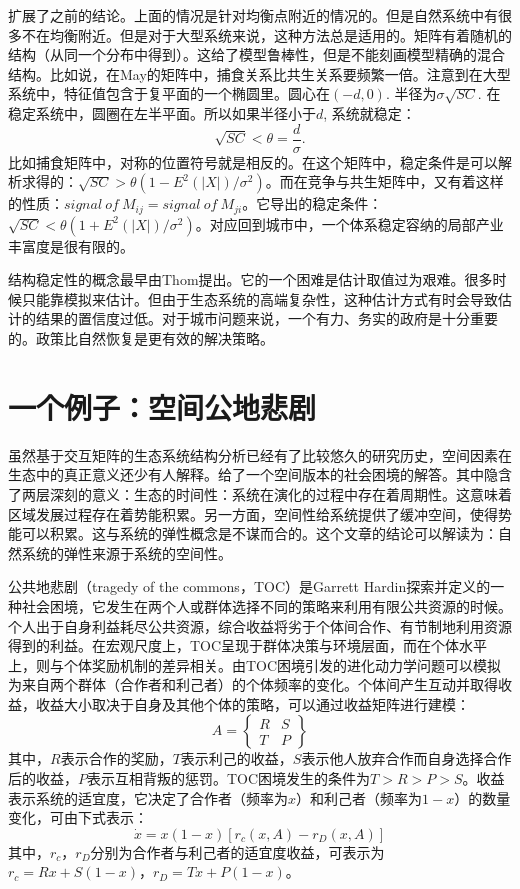 \cite{Allesina2012}扩展了之前的结论。上面的情况是针对均衡点附近的情况的。但是自然系统中有很多不在均衡附近。但是对于大型系统来说，这种方法总是适用的。矩阵有着随机的结构（从同一个分布中得到）。这给了模型鲁棒性，但是不能刻画模型精确的混合结构。比如说，在May的矩阵中，捕食关系比共生关系要频繁一倍。注意到在大型系统中，特征值包含于复平面的一个椭圆里。圆心在$(-d,0).$ 半径为$\sigma\sqrt{SC}.$ 在稳定系统中，圆圈在左半平面。所以如果半径小于$d$, 系统就稳定：\[\sqrt{SC}<\theta =\frac{d}{\sigma}.\]比如捕食矩阵中，对称的位置符号就是相反的。在这个矩阵中，稳定条件是可以解析求得的：$\sqrt{SC}>\theta(1-E^2(|X|)/\sigma^2)$。而在竞争与共生矩阵中，又有着这样的性质：$signal\ of\ M_{ij}=signal\ of\ M_{ji}$。它导出的稳定条件：$\sqrt{SC}<\theta(1+E^2(|X|)/\sigma^2)$。对应回到城市中，一个体系稳定容纳的局部产业丰富度是很有限的。

结构稳定性的概念最早由Thom\cite{thom2018structural}提出。它的一个困难是估计取值过为艰难。很多时候只能靠模拟来估计。但由于生态系统的高端复杂性，这种估计方式有时会导致估计的结果的置信度过低。对于城市问题来说，一个有力、务实的政府是十分重要的。政策比自然恢复是更有效的解决策略。


\section{一个例子：空间公地悲剧}

虽然基于交互矩阵的生态系统结构分析已经有了比较悠久的研究历史，空间因素在生态中的真正意义还少有人解释。\cite{PhysRevLett.122.148102}给了一个空间版本的社会困境的解答。其中隐含了两层深刻的意义：生态的时间性：系统在演化的过程中存在着周期性。这意味着区域发展过程存在着势能积累。另一方面，空间性给系统提供了缓冲空间，使得势能可以积累。这与系统的弹性\cite{gao2016universal}概念是不谋而合的。这个文章的结论可以解读为：自然系统的弹性来源于系统的空间性。

公共地悲剧（tragedy of the commons，TOC）是Garrett Hardin\cite{hardin1968tragedy}探索并定义的一种社会困境，它发生在两个人或群体选择不同的策略来利用有限公共资源的时候。个人出于自身利益耗尽公共资源，综合收益将劣于个体间合作、有节制地利用资源得到的利益。在宏观尺度上，TOC呈现于群体决策与环境层面，而在个体水平上，则与个体奖励机制的差异相关。由TOC困境引发的进化动力学问题可以模拟为来自两个群体（合作者和利己者）的个体频率的变化。个体间产生互动并取得收益，收益大小取决于自身及其他个体的策略，可以通过收益矩阵进行建模：
\[A = \begin{Bmatrix}
R &S \\T &P
\end{Bmatrix}\]
其中，$R$表示合作的奖励，$T$表示利己的收益，$S$表示他人放弃合作而自身选择合作后的收益，$P$表示互相背叛的惩罚。TOC困境发生的条件为$T>R>P>S$。收益表示系统的适宜度，它决定了合作者（频率为$x$）和利己者（频率为$1-x$）的数量变化，可由下式表示：
\begin{equation}
\dot{x} = x(1-x)[r_c(x,A)-r_D(x,A)]
\end{equation}
其中，$r_c$，$r_D$分别为合作者与利己者的适宜度收益，可表示为$r_c=Rx+S(1-x)$，$r_D=Tx+P(1-x)$。

